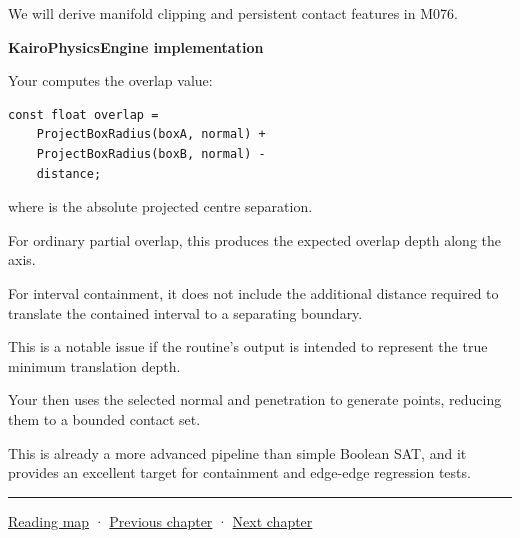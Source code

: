We will derive manifold clipping and persistent contact features in M076.

\textbf{KairoPhysicsEngine implementation}

Your  computes the overlap value:

\begin{verbatim}
const float overlap =
    ProjectBoxRadius(boxA, normal) +
    ProjectBoxRadius(boxB, normal) -
    distance;
\end{verbatim}

where  is the absolute projected centre separation.

For ordinary partial overlap, this produces the expected overlap depth along the axis.

For interval containment, it does not include the additional distance required to translate the contained interval to a separating boundary.

This is a notable issue if the routine's  output is intended to represent the true minimum translation depth.

Your  then uses the selected normal and penetration to generate points, reducing them to a bounded contact set.

This is already a more advanced pipeline than simple Boolean SAT, and it provides an excellent target for containment and edge-edge regression tests.

\begin{center}\rule{0.5\linewidth}{0.5pt}\end{center}

\hyperref[volume-reading-map]{Reading map} · \hyperref[04-visual-computing-ii-ch023-mesh-topology-and-connectivity]{Previous chapter} · \hyperref[04-visual-computing-ii-ch025-sat-for-triangle-and-convex-polygon-tests]{Next chapter}
